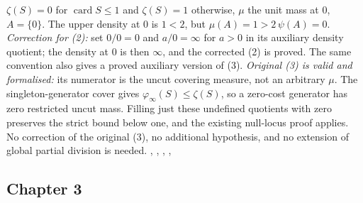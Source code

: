 \documentclass[11pt]{article}
\newcommand{\card}{\operatorname{card}}
\newenvironment{errors}{%
  \par\begingroup
  \def\entrysecondlabel{Printed passage}%
  \def\entrythirdlabel{Correction and evidence}%
}{\par\endgroup}
\begin{document}
\begin{errors}
{$\zeta(S)=0$ for $\card S\le1$ and $\zeta(S)=1$ otherwise, $\mu$ the unit
mass at $0$, $A=\{0\}$. The upper density at $0$ is $1<2$, but
$\mu(A)=1>2\,\psi(A)=0$. \emph{Correction for (2):} set $0/0=0$ and
$a/0=\infty$ for $a>0$ in its auxiliary density quotient; the density at
$0$ is then $\infty$, and the corrected (2) is proved. The same convention
also gives a proved auxiliary version of (3).
\emph{Original (3) is valid and formalised:} its numerator is the uncut
covering measure, not an arbitrary $\mu$. The singleton-generator cover
gives $\varphi_\infty(S)\le\zeta(S)$, so a zero-cost generator has zero
restricted uncut mass. Filling just these undefined quotients with zero
preserves the strict bound below one, and the existing null-locus proof
applies. No correction of the original (3), no additional hypothesis,
and no extension of global partial division is needed.\newline
{},
, ,
, }
\end{errors}

\subsection{Chapter 3}
\end{document}
